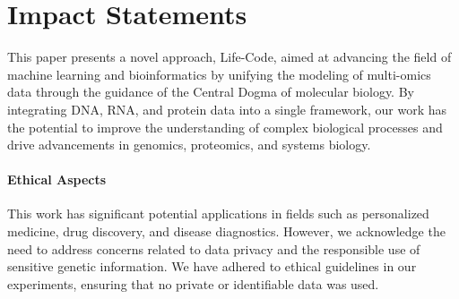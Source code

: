 
\section*{Impact Statements}
This paper presents a novel approach, Life-Code, aimed at advancing the field of machine learning and bioinformatics by unifying the modeling of multi-omics data through the guidance of the Central Dogma of molecular biology. By integrating DNA, RNA, and protein data into a single framework, our work has the potential to improve the understanding of complex biological processes and drive advancements in genomics, proteomics, and systems biology.
\paragraph{Ethical Aspects}
This work has significant potential applications in fields such as personalized medicine, drug discovery, and disease diagnostics. However, we acknowledge the need to address concerns related to data privacy and the responsible use of sensitive genetic information. We have adhered to ethical guidelines in our experiments, ensuring that no private or identifiable data was used.